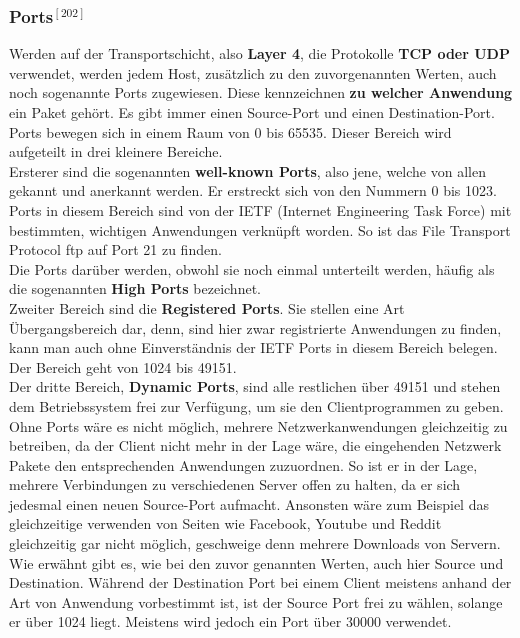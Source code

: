 \documentclass[12pt,a4paper]{report}
\begin{document}
\begin{onehalfspace}
\subsubsection{Ports$^{[202]}$}
Werden auf der Transportschicht, also \textbf{Layer 4}, die Protokolle \textbf{TCP oder UDP} verwendet, werden jedem Host, zusätzlich zu den zuvorgenannten Werten, auch noch sogenannte Ports zugewiesen. Diese kennzeichnen \textbf{zu welcher Anwendung} ein Paket gehört. Es gibt immer einen Source-Port und einen Destination-Port.\\
Ports bewegen sich in einem Raum von 0 bis 65535. Dieser Bereich wird aufgeteilt in drei kleinere Bereiche.\\
Ersterer sind die sogenannten \textbf{well-known Ports}, also jene, welche von allen gekannt und anerkannt werden. Er erstreckt sich von den Nummern 0 bis 1023. Ports in diesem Bereich sind von der IETF (Internet Engineering Task Force) mit bestimmten, wichtigen Anwendungen verknüpft worden. So ist das File Transport Protocol ftp auf Port 21 zu finden.\\
Die Ports darüber werden, obwohl sie noch einmal unterteilt werden, häufig als die sogenannten \textbf{High Ports} bezeichnet.\\
Zweiter Bereich sind die \textbf{Registered Ports}. Sie stellen eine Art Übergangsbereich dar, denn, sind hier zwar registrierte Anwendungen zu finden, kann man auch ohne Einverständnis der IETF Ports in diesem Bereich belegen. Der Bereich geht von 1024 bis 49151.\\
Der dritte Bereich, \textbf{Dynamic Ports}, sind alle restlichen über 49151 und stehen dem Betriebssystem frei zur Verfügung, um sie den Clientprogrammen zu geben.\\

Ohne Ports wäre es nicht möglich, mehrere Netzwerkanwendungen gleichzeitig zu betreiben, da der Client nicht mehr in der Lage wäre, die eingehenden Netzwerk Pakete den entsprechenden Anwendungen zuzuordnen. So ist er in der Lage, mehrere Verbindungen zu verschiedenen Server offen zu halten, da er sich jedesmal einen neuen Source-Port aufmacht. Ansonsten wäre zum Beispiel das gleichzeitige verwenden von Seiten wie Facebook, Youtube und Reddit gleichzeitig gar nicht möglich, geschweige denn mehrere Downloads von Servern.\\

Wie erwähnt gibt es, wie bei den zuvor genannten Werten, auch hier Source und Destination. Während der Destination Port bei einem Client meistens anhand der Art von Anwendung vorbestimmt ist, ist der Source Port frei zu wählen, solange er über 1024 liegt. Meistens wird jedoch ein Port über 30000 verwendet. 


\end{onehalfspace}
\end{document}
